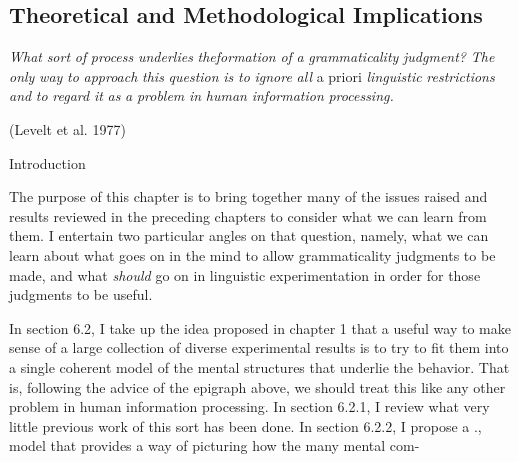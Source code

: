 \clearpage\setcounter{page}{1}\subsection[Theoretical and Methodological Implications]{Theoretical and Methodological Implications}
\begin{styleStandard}
\textit{What}\textit{ }\textit{sort}\textit{ }\textit{of}\textit{ }\textit{process}\textit{ }\textit{underlies}\textit{ }\textit{theformation}\textit{ }\textit{of}\textit{ }\textit{a}\textit{ }\textit{grammaticality}\textit{ }\textit{judgment?}\textit{ }\textit{The}\textit{ }\textit{only}\textit{ }\textit{way}\textit{ }\textit{to}\textit{ }\textit{approach}\textit{ }\textit{this}\textit{ }\textit{question}\textit{ }\textit{is}\textit{ }\textit{to}\textit{ }\textit{ignore}\textit{ }\textit{all}\textit{ }a priori \textit{linguistic}\textit{ }\textit{restrictions}\textit{ }\textit{and}\textit{ }\textit{to}\textit{ }\textit{regard}\textit{ }\textit{it}\textit{ }\textit{as}\textit{ }\textit{a}\textit{ }\textit{problem}\textit{ }\textit{in}\textit{ }\textit{human}\textit{ }\textit{information}\textit{ }\textit{processing.}
\end{styleStandard}


\begin{styleStandard}
(Levelt et al. 1977)
\end{styleStandard}


\begin{styleHeadingvii}
Introduction
\end{styleHeadingvii}


\begin{styleTextbody}
The purpose of this chapter is to bring together many of the issues raised and results reviewed in the preceding chapters to consider what we can learn from them. I entertain two particular angles on that question, namely, what we can learn about what goes on in the mind to allow grammaticality judgments to be made, and what \textit{should}\textit{ }go on in linguistic experimentation in order for those judgments to be useful.
\end{styleTextbody}


\begin{styleTextbody}
In section 6.2, I take up the idea proposed in chapter 1 that a useful way to make sense of a large collection of diverse experimental results is to try to fit them into a single coherent model of the mental structures that underlie the behavior. That is, following the advice of the epigraph above, we should treat this like any other problem in human information processing. In section 6.2.1, I review what very little previous work of this sort has been done. In section 6.2.2, I propose a {\textquotedbl}{\textquotedbl}{\textquotedbl}{\textquotedbl}{\textquotesingle}{\textquotesingle}{\textquotedbl}{\textquotedbl}., model that provides a way of picturing how the many mental com-
\end{styleTextbody}


